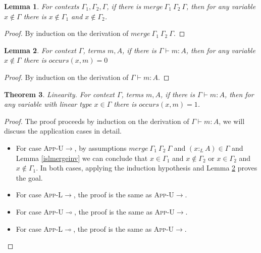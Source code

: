 \documentclass{article}
\newtheorem{theorem}{Theorem}[section]
\newtheorem{lemma}[theorem]{Lemma}
\theoremstyle{definition}
\newcommand{\rname}[1]{\textsc{\footnotesize #1}}
\newcommand{\ltype}{:_{\scriptscriptstyle L}}
\newcommand{\mrg}[3]{merge\ {#1}\ {#2}\ {#3}}
\begin{document}
\begin{lemma}
  For contexts $\Gamma_1, \Gamma_2, \Gamma$, if there is $\mrg{\Gamma_1}{\Gamma_2}{\Gamma}$, then for any variable $x \notin \Gamma$ there is $x \notin \Gamma_1$ and $x \notin \Gamma_2$.
\end{lemma}
\begin{proof}
  By induction on the derivation of $\mrg{\Gamma_1}{\Gamma_2}{\Gamma}$.
\end{proof}

\begin{lemma}\label{narity}
  For context $\Gamma$, terms $m, A$, if there is $\Gamma \vdash m : A$, then for any variable $x \notin \Gamma$ there is $occurs(x, m) = 0$
\end{lemma}
\begin{proof}
  By induction on the derivation of $\Gamma \vdash m : A$.
\end{proof}

\begin{theorem}\label{linearity}
  Linearity. For context $\Gamma$, terms $m, A$, if there is $\Gamma \vdash m : A$, then for any variable with linear type $x \in \Gamma$ there is $occurs(x, m) = 1$.
\end{theorem}
\begin{proof}
  The proof proceeds by induction on the derivation of $\Gamma \vdash m : A$, we will discuss the application cases in detail.
  \begin{itemize}
    \item For case \rname{App-U$\rightarrow$}, by assumptions $\mrg{\Gamma_1}{\Gamma_2}{\Gamma}$ and $(x \ltype A) \in \Gamma$ and Lemma \ref{islmergeinv} we can conclude that $x \in \Gamma_1$ and $x \notin \Gamma_2$ or $x \in \Gamma_2$ and $x \notin \Gamma_1$. In both cases, applying the induction hypothesis and Lemma \ref{narity} proves the goal.
    \item For case \rname{App-L$\rightarrow$}, the proof is the same as \rname{App-U$\rightarrow$}.
    \item For case \rname{App-U$\multimap$}, the proof is the same as \rname{App-U$\rightarrow$}.
    \item For case \rname{App-L$\multimap$}, the proof is the same as \rname{App-U$\rightarrow$}.
  \end{itemize}
\end{proof}
\end{document}
